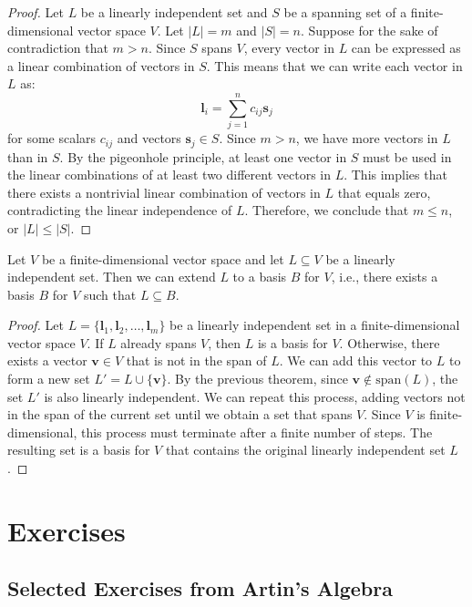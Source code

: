 \documentclass[openany]{book}
\begin{document}
\begin{proof}
    Let $L$ be a linearly independent set and $S$ be a spanning set of a finite-dimensional vector space $V$. Let $|L| = m$ and $|S| = n$. Suppose for the sake of contradiction that $m > n$. Since $S$ spans $V$, every vector in $L$ can be expressed as a linear combination of vectors in $S$. This means that we can write each vector in $L$ as:
    $$\mathbf{l}_i = \sum_{j=1}^n c_{ij} \mathbf{s}_j$$
    for some scalars $c_{ij}$ and vectors $\mathbf{s}_j \in S$. Since $m > n$, we have more vectors in $L$ than in $S$. By the pigeonhole principle, at least one vector in $S$ must be used in the linear combinations of at least two different vectors in $L$. This implies that there exists a nontrivial linear combination of vectors in $L$ that equals zero, contradicting the linear independence of $L$. Therefore, we conclude that $m \leq n$, or $\lvert L \rvert \leq \lvert S \rvert$. 
\end{proof}
\begin{mytheorem}
    Let $V$ be a finite-dimensional vector space and let $L \subseteq V$ be a linearly independent set. Then we can extend $L$ to a basis $B$ for $V$, i.e., there exists a basis $B$ for $V$ such that $L \subseteq B$.
\end{mytheorem}
\begin{proof}
    Let $L = \{\mathbf{l}_1, \mathbf{l}_2, \ldots, \mathbf{l}_m\}$ be a linearly independent set in a finite-dimensional vector space $V$. If $L$ already spans $V$, then $L$ is a basis for $V$. Otherwise, there exists a vector $\mathbf{v} \in V$ that is not in the span of $L$. We can add this vector to $L$ to form a new set $L' = L \cup \{\mathbf{v}\}$. By the previous theorem, since $\mathbf{v} \notin \text{span}(L)$, the set $L'$ is also linearly independent. We can repeat this process, adding vectors not in the span of the current set until we obtain a set that spans $V$. Since $V$ is finite-dimensional, this process must terminate after a finite number of steps. The resulting set is a basis for $V$ that contains the original linearly independent set $L$.
\end{proof}

\section{Exercises}
\subsection{Selected Exercises from Artin's Algebra}
\end{document}
